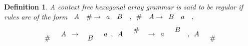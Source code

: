 \documentclass[11pt]{article}
\newtheorem{definition}[theorem]{Definition}
\begin{document}
\begin{definition}A context free hexagonal array grammar is said to be regular if rules are of the form
$
\begin{array}{*{20}c}
   A & {\#  \to \begin{array}{*{20}c}
   a & B  \\
\end{array}}  \\
\end{array},\begin{array}{*{20}c}
   \#  & {A \to \begin{array}{*{20}c}
   B & a  \\
\end{array}}  \\
\end{array},
$
\[
\begin{array}{*{20}c}
   {\begin{array}{*{20}c}
   {}  \\
   \#   \\
\end{array}} & A  \\
\end{array} \to \begin{array}{*{20}c}
   {\begin{array}{*{20}c}
   {}  \\
   B  \\
\end{array}} & a  \\
\end{array},\begin{array}{*{20}c}
   A & {\begin{array}{*{20}c}
   \#   \\
   {}  \\
\end{array}}  \\
\end{array} \to \begin{array}{*{20}c}
   a & {\begin{array}{*{20}c}
   B  \\
   {}  \\
\end{array}}  \\
\end{array},\begin{array}{*{20}c}
   A & {\begin{array}{*{20}c}
   {}  \\
   \#   \\

\end{array}}
\end{array}\]
\end{definition}
\end{document}
